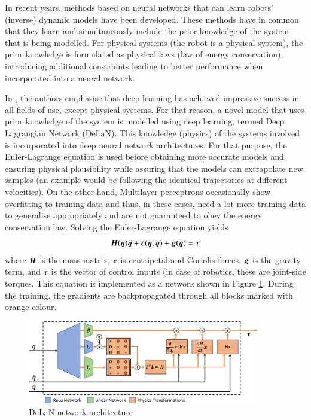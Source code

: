 In recent years, methods based on neural networks that can learn robots' (inverse) dynamic models have been developed. These methods have in common that they learn and simultaneously include the prior knowledge of the system that is being modelled. For physical systems (the robot is a physical system), the prior knowledge is formulated as physical laws (law of energy conservation), introducing additional constraints leading to better performance when incorporated into a neural network.

In \cite{Lutter2019, Lutter2019a}, the authors emphasise that deep learning has achieved impressive success in all fields of use, except physical systems. For that reason, a novel model that uses prior knowledge of the system is modelled using deep learning, termed Deep Lagrangian Network (DeLaN). This knowledge (physics) of the systems involved is incorporated into deep neural network architectures. For that purpose, the Euler-Lagrange equation is used before obtaining more accurate models and ensuring physical plausibility while assuring that the models can extrapolate new samples (an example would be following the identical trajectories at different velocities). On the other hand, Multilayer perceptrons occasionally show overfitting to training data and thus, in these cases, need a lot more training data to generalise appropriately and are not guaranteed to obey the energy conservation law. Solving the Euler-Lagrange equation yields
\[
    {\bm{H}}({\bm{q}})\ddot{{\bm{q}}} + {\bm{c}}({\bm{q}},\dot{{\bm{q}}}) + {\bm{g}}({\bm{q}}) = {\bm{\tau}}
\]
where ${\bm{H}}$ is the mass matrix, ${\bm{c}}$ is centripetal and Coriolis forces, ${\bm{g}}$ is the gravity term, and ${\bm{\tau}}$ is the vector of control inputs (in case of robotics, these are joint-side torques. This equation is implemented as a network shown in Figure \ref{fig:DeLaN}. During the training, the gradients are backpropagated through all blocks marked with orange colour.

\begin{figure}
    \centering
    \includegraphics[width=0.9\textwidth]{slike/delan.png}
    \caption[DeLaN network architecture]{DeLaN network architecture \cite{Lutter2019}}
    \label{fig:DeLaN}
\end{figure}

